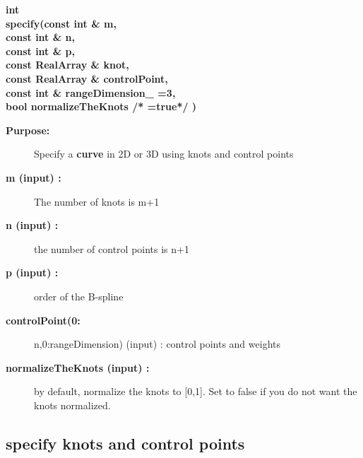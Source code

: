 \begin{flushleft} \textbf{%
int  \\ 
\settowidth{\NurbsMappingIncludeArgIndent}{specify(}%
specify(const int \&  m,\\ 
\hspace{\NurbsMappingIncludeArgIndent}const int \& n,\\ 
\hspace{\NurbsMappingIncludeArgIndent}const int \& p,\\ 
\hspace{\NurbsMappingIncludeArgIndent}const RealArray \& knot,\\ 
\hspace{\NurbsMappingIncludeArgIndent}const RealArray \& controlPoint,\\ 
\hspace{\NurbsMappingIncludeArgIndent}const int \& rangeDimension\_  =3,\\ 
\hspace{\NurbsMappingIncludeArgIndent}bool normalizeTheKnots /* =true*/  )
}\end{flushleft}
\begin{description}
\item[{\bf Purpose:}]  Specify a {\bf curve} in 2D or 3D using knots and control points
\item[{\bf m (input) :}]  The number of knots is m+1
\item[{\bf n (input) :}]  the number of control points is n+1
\item[{\bf p (input) :}]  order of the B-spline
\item[{\bf controlPoint(0:}] n,0:rangeDimension) (input) : control points and weights
\item[{\bf normalizeTheKnots (input) :}]  by default, normalize the knots to [0,1]. Set to false
    if you do not want the knots normalized. 
\end{description}
\subsection{specify knots and control points}
 
